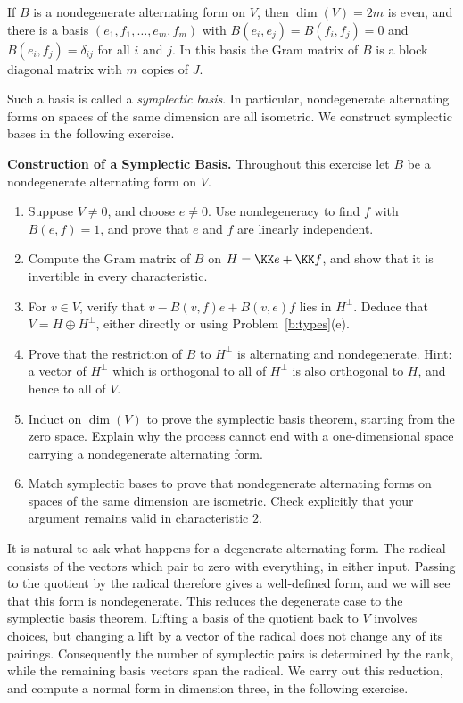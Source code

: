 \documentclass[12pt,reqno]{amsart}
\begin{document}
\begin{theorem}
If $B$ is a nondegenerate alternating form on $V$, then $\dim(V)=2m$ is even, and there is a basis $(e_1,f_1,\ldots,e_m,f_m)$ with $B(e_i,e_j)=B(f_i,f_j)=0$ and $B(e_i,f_j)=\delta_{ij}$ for all $i$ and $j$. In this basis the Gram matrix of $B$ is a block diagonal matrix with $m$ copies of $J$.
\end{theorem}

Such a basis is called a \emph{symplectic basis}. In particular, nondegenerate alternating forms on spaces of the same dimension are all isometric. We construct symplectic bases in the following exercise.

\hrulefill

\begin{problems}
\item\label{b:symplectic} \textbf{Construction of a Symplectic Basis.} Throughout this exercise let $B$ be a nondegenerate alternating form on $V$.
\begin{enumerate}
\item Suppose $V\ne0$, and choose $e\ne0$. Use nondegeneracy to find $f$ with $B(e,f)=1$, and prove that $e$ and $f$ are linearly independent.
\item Compute the Gram matrix of $B$ on $H=\KK e+\KK f$, and show that it is invertible in every characteristic.
\item For $v\in V$, verify that $v-B(v,f)e+B(v,e)f$ lies in $H^{\perp}$. Deduce that $V=H\oplus H^{\perp}$, either directly or using Problem~\ref{b:types}(e).
\item Prove that the restriction of $B$ to $H^{\perp}$ is alternating and nondegenerate. Hint: a vector of $H^{\perp}$ which is orthogonal to all of $H^{\perp}$ is also orthogonal to $H$, and hence to all of $V$.
\item Induct on $\dim(V)$ to prove the symplectic basis theorem, starting from the zero space. Explain why the process cannot end with a one-dimensional space carrying a nondegenerate alternating form.
\item Match symplectic bases to prove that nondegenerate alternating forms on spaces of the same dimension are isometric. Check explicitly that your argument remains valid in characteristic $2$.
\end{enumerate}
\end{problems}

\hrulefill

It is natural to ask what happens for a degenerate alternating form. The radical consists of the vectors which pair to zero with everything, in either input. Passing to the quotient by the radical therefore gives a well-defined form, and we will see that this form is nondegenerate. This reduces the degenerate case to the symplectic basis theorem. Lifting a basis of the quotient back to $V$ involves choices, but changing a lift by a vector of the radical does not change any of its pairings. Consequently the number of symplectic pairs is determined by the rank, while the remaining basis vectors span the radical. We carry out this reduction, and compute a normal form in dimension three, in the following exercise.
\end{document}
